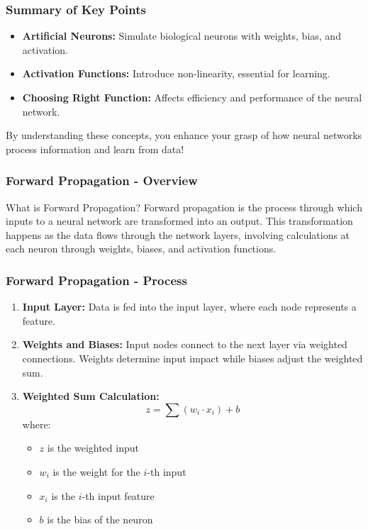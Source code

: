 \documentclass[aspectratio=169]{beamer}
\begin{document}
\begin{frame}[fragile]
  \frametitle{Summary of Key Points}
  \begin{itemize}
    \item \textbf{Artificial Neurons:} Simulate biological neurons with weights, bias, and activation.
    \item \textbf{Activation Functions:} Introduce non-linearity, essential for learning.
    \item \textbf{Choosing Right Function:} Affects efficiency and performance of the neural network.
  \end{itemize}
  
  By understanding these concepts, you enhance your grasp of how neural networks process information and learn from data!
\end{frame}

\begin{frame}[fragile]
    \frametitle{Forward Propagation - Overview}
    \begin{block}{What is Forward Propagation?}
        Forward propagation is the process through which inputs to a neural network are transformed into an output. This transformation happens as the data flows through the network layers, involving calculations at each neuron through weights, biases, and activation functions.
    \end{block}
\end{frame}

\begin{frame}[fragile]
    \frametitle{Forward Propagation - Process}
    \begin{enumerate}
        \item \textbf{Input Layer:} Data is fed into the input layer, where each node represents a feature.
        \item \textbf{Weights and Biases:} Input nodes connect to the next layer via weighted connections. Weights determine input impact while biases adjust the weighted sum.
        \item \textbf{Weighted Sum Calculation:}
        \begin{equation}
            z = \sum (w_i \cdot x_i) + b
        \end{equation}
        where:
        \begin{itemize}
            \item $z$ is the weighted input
            \item $w_i$ is the weight for the $i$-th input
            \item $x_i$ is the $i$-th input feature
            \item $b$ is the bias of the neuron
        \end{itemize}
    \end{enumerate}
\end{frame}
\end{document}
